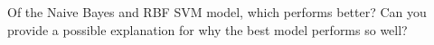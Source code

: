 Of the Naive Bayes and RBF SVM model, which performs better? Can you provide a possible explanation for why the best model performs so well?

\ifnum{} {
  
} \fi

